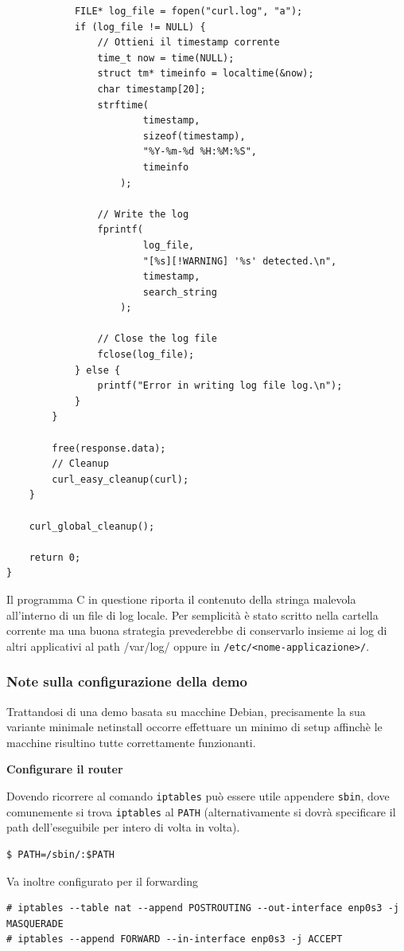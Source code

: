 \documentclass{ldr-article}
\begin{document}
\begin{lstlisting}
			FILE* log_file = fopen("curl.log", "a");
			if (log_file != NULL) {
				// Ottieni il timestamp corrente
				time_t now = time(NULL);
				struct tm* timeinfo = localtime(&now);
				char timestamp[20];
				strftime(
                        timestamp,
                        sizeof(timestamp),
                        "%Y-%m-%d %H:%M:%S",
                        timeinfo
                    );

				// Write the log
				fprintf(
                        log_file,
                        "[%s][!WARNING] '%s' detected.\n",
                        timestamp,
                        search_string
                    );

				// Close the log file
				fclose(log_file);
			} else {
				printf("Error in writing log file log.\n");
			}
		}

		free(response.data);
		// Cleanup
		curl_easy_cleanup(curl);
	}

	curl_global_cleanup();

	return 0;
}

\end{lstlisting}

Il programma C in questione riporta il contenuto della stringa malevola all'interno di un file di log locale. Per semplicità è stato scritto nella cartella corrente ma una buona strategia prevederebbe di conservarlo insieme ai log di altri applicativi al path \texttt{}{/var/log/} oppure in \texttt{/etc/<nome-applicazione>/}.

\subsubsection{Note sulla configurazione della demo}
Trattandosi di una demo basata su macchine Debian, precisamente la sua variante minimale netinstall occorre effettuare un minimo di setup affinchè le macchine risultino tutte correttamente funzionanti.

\textbf{Configurare il router}

Dovendo ricorrere al comando \texttt{iptables} può essere utile appendere \texttt{sbin}, dove comunemente si trova \texttt{iptables} al \texttt{PATH} (alternativamente si dovrà specificare il path dell'eseguibile per intero di volta in volta).

\begin{lstlisting}
$ PATH=/sbin/:$PATH
\end{lstlisting}

Va inoltre configurato per il forwarding
\begin{lstlisting}
# iptables --table nat --append POSTROUTING --out-interface enp0s3 -j MASQUERADE
# iptables --append FORWARD --in-interface enp0s3 -j ACCEPT
\end{lstlisting}
\end{document}
